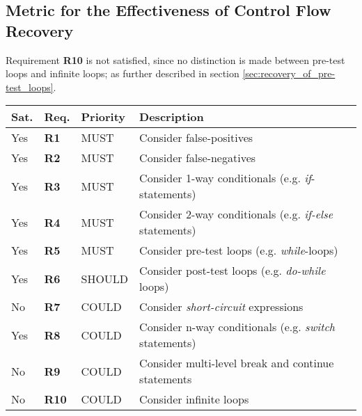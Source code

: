 
\subsection{Metric for the Effectiveness of Control Flow Recovery}
\label{sec:cfa_metric}



Requirement \textbf{R10} is not satisfied, since no distinction is made between pre-test loops and infinite loops; as further described in section \ref{sec:recovery_of_pre-test_loops}.

\begin{table}[htbp]
	\begin{center}
		\begin{tabular}{|l|l|l|l|}
			\hline
			Sat. & Req. & Priority & Description \\
			\hline
			\rowcolor{light_green_3}
			Yes & \textbf{R1} & MUST & Consider false-positives \\
			\rowcolor{light_green_3}
			Yes & \textbf{R2} & MUST & Consider false-negatives \\
			\rowcolor{light_green_3}
			Yes & \textbf{R3} & MUST & Consider 1-way conditionals (e.g. \textit{if}-statements) \\
			\rowcolor{light_green_3}
			Yes & \textbf{R4} & MUST & Consider 2-way conditionals (e.g. \textit{if-else} statements) \\
			\rowcolor{light_green_3}
			Yes & \textbf{R5} & MUST & Consider pre-test loops (e.g. \textit{while}-loops) \\
			\hline
			\rowcolor{light_green_3}
			Yes & \textbf{R6} & SHOULD & Consider post-test loops (e.g. \textit{do-while} loops) \\
			\hline
			\rowcolor{light_red_3}
			No & \textbf{R7} & COULD & Consider \textit{short-circuit} expressions \\
			\rowcolor{light_green_3}
			Yes & \textbf{R8} & COULD & Consider n-way conditionals (e.g. \textit{switch} statements) \\
			\rowcolor{light_red_3}
			No & \textbf{R9} & COULD & Consider multi-level break and continue statements \\
			\rowcolor{light_red_3}
			No & \textbf{R10} & COULD & Consider infinite loops \\

\end{tabular}
\end{center}
\end{table}
